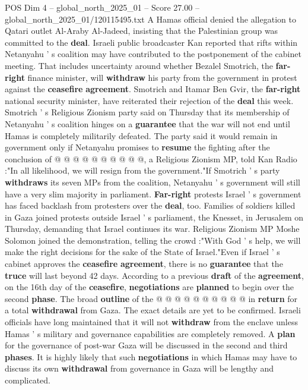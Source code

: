 \begin{textsample}{POS Dim 4 – global\_north\_2025\_01 – Score 27.00 – global\_north\_2025\_01/120115495.txt}
A Hamas official denied the allegation to Qatari outlet Al-Araby Al-Jadeed, insisting that the Palestinian group was committed to the \textbf{deal}.
Israeli public broadcaster Kan reported that rifts within Netanyahu ' s coalition may have contributed to the postponement of the cabinet meeting.
That includes uncertainty around whether Bezalel Smotrich, the \textbf{far-right} finance minister, will \textbf{withdraw} his party from the government in protest against the \textbf{ceasefire} \textbf{agreement}.
Smotrich and Itamar Ben Gvir, the \textbf{far-right} national security minister, have reiterated their rejection of the \textbf{deal} this week.
Smotrich ' s Religious Zionism party said on Thursday that its membership of Netanyahu ' s coalition hinges on a \textbf{guarantee} that the war will not end until Hamas is completely militarily defeated.
The party said it would remain in government only if Netanyahu promises to \textbf{resume} the fighting after the conclusion of @ @ @ @ @ @ @ @ @ @, a Religious Zionism MP, told Kan Radio :"In all likelihood, we will resign from the government."If Smotrich ' s party \textbf{withdraws} its seven MPs from the coalition, Netanyahu ' s government will still have a very slim majority in parliament. \textbf{Far-right} protests Israel ' s government has faced backlash from protesters over the \textbf{deal}, too.
Families of soldiers killed in Gaza joined protests outside Israel ' s parliament, the Knesset, in Jerusalem on Thursday, demanding that Israel continues its war.
Religious Zionism MP Moshe Solomon joined the demonstration, telling the crowd :"With God ' s help, we will make the right decisions for the sake of the State of Israel."Even if Israel ' s cabinet approves the \textbf{ceasefire} \textbf{agreement}, there is no \textbf{guarantee} that the \textbf{truce} will last beyond 42 days.
According to a previous \textbf{draft} of the \textbf{agreement}, on the 16th day of the \textbf{ceasefire}, \textbf{negotiations} are \textbf{planned} to begin over the second \textbf{phase}.
The broad \textbf{outline} of the @ @ @ @ @ @ @ @ @ @ in \textbf{return} for a total \textbf{withdrawal} from Gaza.
The exact details are yet to be confirmed.
Israeli officials have long maintained that it will not \textbf{withdraw} from the enclave unless Hamas ' s military and governance capabilities are completely removed.
A \textbf{plan} for the governance of post-war Gaza will be discussed in the second and third \textbf{phases}.
It is highly likely that such \textbf{negotiations} in which Hamas may have to discuss its own \textbf{withdrawal} from governance in Gaza will be lengthy and complicated.

\end{textsample}
